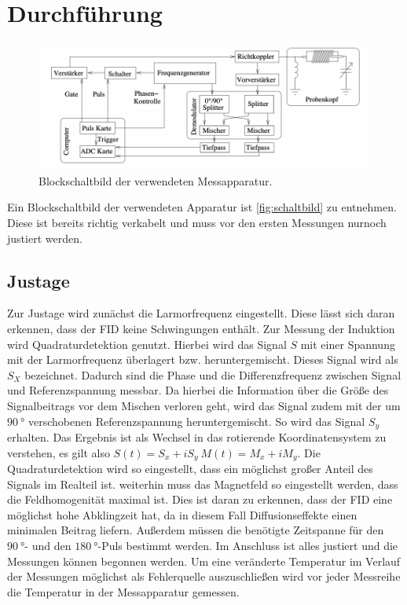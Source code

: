 \section{Durchführung}

\begin{figure}[tb]
  \centering
  \includegraphics[width=\textwidth,keepaspectratio]{schaltbild.png}
  \caption{Blockschaltbild der verwendeten Messapparatur\cite{info}.}
  \label{fig:schaltbild}
\end{figure}

Ein Blockschaltbild der verwendeten Apparatur ist \autoref{fig:schaltbild} zu entnehmen. Diese ist bereits richtig verkabelt und muss vor den ersten Messungen nurnoch justiert werden.

\subsection{Justage}
Zur Justage wird zunächst die Larmorfrequenz eingestellt. Diese lässt sich daran erkennen, dass der FID keine Schwingungen enthält.
Zur Messung der Induktion wird Quadraturdetektion genutzt. Hierbei wird das Signal $S$ mit einer Spannung mit der Larmorfrequenz überlagert bzw. heruntergemischt. Dieses Signal wird als $S_X$ bezeichnet. Dadurch sind die Phase und die Differenzfrequenz zwischen Signal und Referenzspannung messbar. Da hierbei die Information über die Größe des Signalbeitrags vor dem Mischen verloren geht, wird das Signal zudem mit der um $\SI{90}{\degree}$ verschobenen Referenzspannung heruntergemischt. So wird das Signal $S_y$ erhalten. Das Ergebnis ist als Wechsel in das rotierende Koordinatensystem zu verstehen, es gilt also $S(t) = S_x + i S_y ~ M(t) = M_x + i M_y$. Die Quadraturdetektion wird so eingestellt, dass ein möglichst großer Anteil des Signals im Realteil ist.
weiterhin muss das Magnetfeld so eingestellt werden, dass die Feldhomogenität maximal ist. Dies ist daran zu erkennen, dass der FID eine möglichst hohe Abklingzeit hat, da in diesem Fall Diffusionseffekte einen minimalen Beitrag liefern.
Außerdem müssen die benötigte Zeitspanne für den $\SI{90}{\degree}$- und den $\SI{180}{\degree}$-Puls bestimmt werden.
Im Anschluss ist alles justiert und die Messungen können begonnen werden. Um eine veränderte Temperatur im Verlauf der Messungen möglichst als Fehlerquelle auszuschließen wird vor jeder Messreihe die Temperatur in der Messapparatur gemessen.

